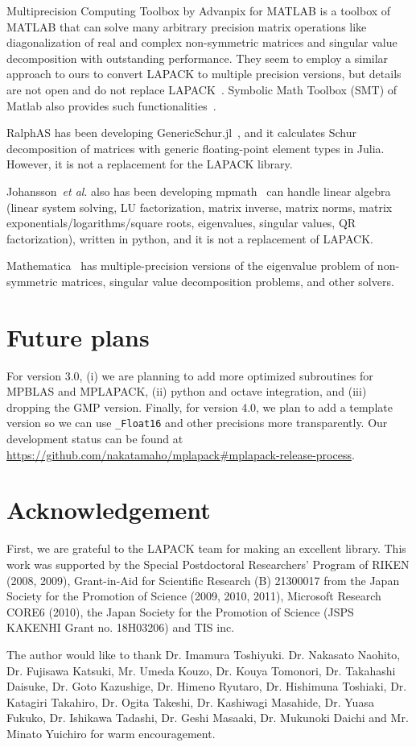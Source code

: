 \documentclass[12pt]{article}
\newcommand{\etal}{\textit{et al}.}
\begin{document}
Multiprecision Computing Toolbox by Advanpix for MATLAB is a toolbox of MATLAB that can solve many arbitrary precision matrix operations
like diagonalization of real and complex non-symmetric matrices and singular value decomposition with
outstanding performance. They seem to employ a similar approach to ours to convert LAPACK to multiple precision versions, but details are not open and do not replace LAPACK~\cite{advanpix}. Symbolic Math Toolbox (SMT) of Matlab also provides such functionalities~\cite{matlabsymbolic}.

RalphAS has been developing GenericSchur.jl~\cite{GenericSchur}, and it calculates Schur decomposition of matrices with generic floating-point element types in Julia. However, it is not a replacement for the LAPACK library.

Johansson~\etal{} also has been developing mpmath~\cite{mpmath} can handle linear algebra (linear system solving, LU factorization, matrix inverse, matrix norms, matrix exponentials/logarithms/square roots, eigenvalues, singular values, QR factorization), written in python, and it is not a replacement of LAPACK.

Mathematica~\cite{mathematica} has multiple-precision versions of the eigenvalue problem of non-symmetric matrices, singular value decomposition problems, and other solvers.

\section{Future plans}
\label{sec:futureplans}
For version 3.0, (i) we are planning to add more optimized subroutines for MPBLAS and MPLAPACK, (ii) python and octave integration, and (iii) dropping the GMP version. Finally, for version 4.0, we plan to add a template version so we can use {\tt \_Float16} and other precisions more transparently.
Our development status can be found at \url{https://github.com/nakatamaho/mplapack#mplapack-release-process}.

\section*{Acknowledgement}

First, we are grateful to the LAPACK team for making an excellent library.
This work was supported by the Special Postdoctoral Researchers' Program of RIKEN (2008, 2009), Grant-in-Aid for Scientific Research (B) 21300017 from the Japan Society for the Promotion of Science (2009, 2010, 2011), Microsoft Research CORE6 (2010), the Japan Society for the Promotion of Science (JSPS KAKENHI Grant no. 18H03206) and TIS inc.

The author would like to thank Dr. Imamura Toshiyuki. Dr. Nakasato Naohito, Dr. Fujisawa Katsuki, Mr. Umeda Kouzo, Dr. Kouya Tomonori, Dr. Takahashi Daisuke, Dr. Goto Kazushige, Dr. Himeno Ryutaro, Dr. Hishimuna Toshiaki, Dr. Katagiri Takahiro, Dr. Ogita Takeshi, Dr. Kashiwagi Masahide, Dr. Yuasa Fukuko, Dr. Ishikawa Tadashi, Dr. Geshi Masaaki, Dr. Mukunoki Daichi and Mr. Minato Yuichiro for warm encouragement.


\end{document}
